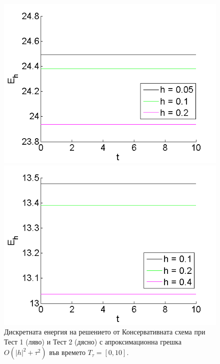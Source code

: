 \documentclass[a4paper]{article}
\theoremstyle{remark}
\begin{document}
\begin{figure}[ht]\vspace{0.02cm}
	\begin{minipage}[b]{0.48\linewidth}
		\includegraphics[width=\linewidth]{../amitans/figures/Energy_EnergySave_bt3_c045_x3O.png}	
	\end{minipage}
	\begin{minipage}[b]{0.48\linewidth}
		 \includegraphics[width=\linewidth]{../amitans/figures/Energy_EnergySave_bt1_c090_x3O.png}
	\end{minipage}
\caption{Дискретната енергия на решението от Консервативната схема при Тест 1 (ляво) и Тест 2 (дясно) с апроксимационна грешка $O(|h|^2 + \tau^2)$ във времето $T_{\tau} = [0, 10]$.}
\label{EnOnly}
\end{figure}
\end{document}
